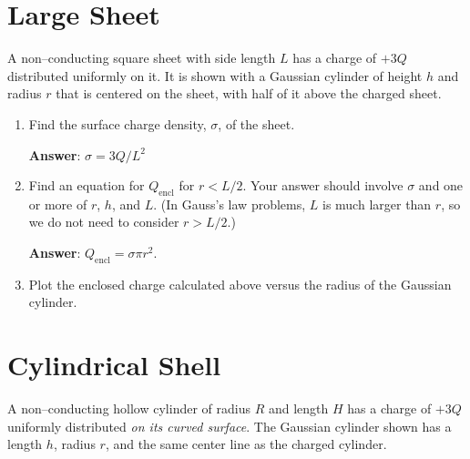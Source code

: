 \documentclass{article}
\begin{document}
\newpage

\section{Large Sheet}

A non--conducting square sheet with side length $L$ has a charge of $+3Q$ distributed uniformly on it. It is shown with a Gaussian cylinder of height $h$ and radius $r$ that is centered on the sheet, with half of it above the charged sheet.



\begin{enumerate}

  \item Find the surface charge density, $\sigma$, of the sheet.

        \ifsolutions
        {\bf Answer}: $\sigma=3Q/L^2$
        \fi

        \ifsolutions\else
        \vskip 36pt
        \fi

  \item Find an equation for $Q_{\text{encl}}$ for $r<L/2$. Your answer should involve $\sigma$ and one or more of $r$, $h$, and $L$. (In Gauss's law problems, $L$ is much larger than $r$, so we do not need to consider $r > L/2$.)

        \ifsolutions
        {\bf Answer}: $Q_{\text{encl}}=\sigma \pi r^2$.
        \fi

        \ifsolutions\else
        \vskip 36pt
        \fi

  \item Plot the enclosed charge calculated above versus the radius of the Gaussian cylinder.

        \ifsolutions
        
        \fi

\end{enumerate}

\newpage

\section{Cylindrical Shell}

A non--conducting hollow cylinder of radius $R$ and length $H$ has a charge of $+3Q$ uniformly distributed \emph{on its curved surface}. The Gaussian cylinder shown has a length $h$, radius $r$, and the same center line as the charged cylinder.


\end{document}
